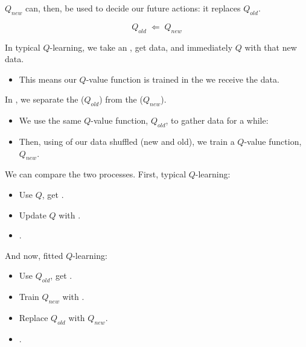         $Q_{new}$ can, then, be used to decide our future actions: it replaces $Q_{old}$.

        \begin{equation}
            Q_{old} \;\Leftarrow\; Q_{new}
        \end{equation}
        
        

        \begin{concept}

            In typical $Q$-learning, we take an , get data, and immediately  $Q$ with that new data.

            \begin{itemize}
                \item This means our $Q$-value function is trained in the  we receive the data.
            \end{itemize}

            \subsecdiv

        
            In , we separate the  ($Q_{old}$) from the  ($Q_{new}$).

            \begin{itemize}
                \item We use the same $Q$-value function, $Q_{old}$, to gather data for a while: 
                \item Then, using  of our data shuffled (new and old), we train a  $Q$-value function, $Q_{new}$.
            \end{itemize}

            

        \end{concept}

        We can compare the two processes. First, typical $Q$-learning:

        \begin{itemize}
            \item Use $Q$, get . 
            \item Update $Q$ with .
            \item {}.
        \end{itemize}

        And now, fitted $Q$-learning:

        \begin{itemize}
            \item Use $Q_{old}$, get .
            \item Train $Q_{new}$ with . 
            \item Replace $Q_{old}$ with $Q_{new}$. 
            \item {}.
        \end{itemize}


